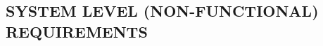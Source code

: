 \documentclass[letterpaper, 10pt, draftclsnofoot, onecolumn]{IEEEtran}
\begin{document}
{\begin{comment}
{\selectlanguage{english}\color{black}
[ insert your text here ]}

\end{comment}



\subsection[SYSTEM LEVEL (NON{}-FUNCTIONAL)
REQUIREMENTS]{\rmfamily\bfseries\color{black}
SYSTEM LEVEL (NON-FUNCTIONAL) REQUIREMENTS}


\begin{comment}



{\selectlanguage{english}\itshape\color{black}

This subsection of the document should identify system level (whole, not
functional) requirements that impact the construction, operation,
packaging and delivery of the system and software.}




\subsubsection[Site
dependencies]{\selectlanguage{english}\rmfamily\bfseries\color{black}
Site dependencies}
{\selectlanguage{english}\color{black}
\foreignlanguage{english}{\textit{This paragraph shall specify
site-dependent operational parameters and needs (such as parameters
indicating operation-dependent targeting constants or data
recording).}}\foreignlanguage{english}{
}\foreignlanguage{english}{\textit{. \ The requirements shall include,
as applicable, number of each type of equipment, type, size, capacity,
and other required characteristics of processors, memory, input/output
devices, auxiliary storage, communications/ network equipment, and
other required equipment or software that must be used by, or
incorporated into, the system. \ Examples include operating systems,
database management systems, communications/ network software, utility
software, input and equipment simulators, test software, and
manufacturing software. \ The correct nomenclature, version, and
documentation references of each such device or software item shall be
provided.}}}

{\selectlanguage{english}\color{black}
[ insert your text here ]}

\subsubsection[Safety, security and privacy
requirements]{\selectlanguage{english}\rmfamily\bfseries\color{black}
Safety, security and privacy requirements}
{\selectlanguage{english}\itshape\color{black}
This paragraph shall specify the system requirements, if any, concerned
with maintaining safety, security and privacy. \ These requirements
shall include, as applicable, the safety, security and privacy
environment in which the system must operate, the type and degree of
security or privacy to be provided, and the criteria that must be met
for safety/security/privacy certification and/or accreditation.}


\end{comment}}
\end{document}
